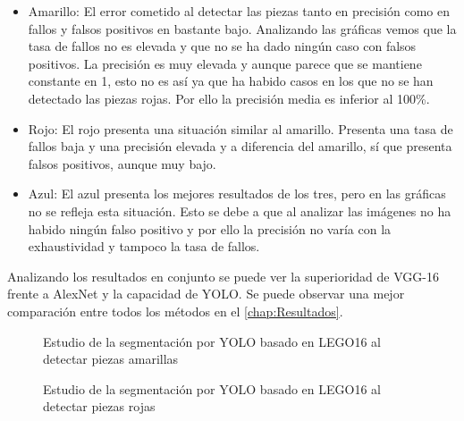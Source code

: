 \begin{itemize}
\item Amarillo: El error cometido al detectar las piezas tanto en precisión como en fallos y falsos positivos en bastante bajo. Analizando las gráficas vemos que la tasa de fallos no es elevada y que no se ha dado ningún caso con falsos positivos. La precisión es muy elevada y aunque parece que se mantiene constante en 1, esto no es así ya que ha habido casos en los que no se han detectado las piezas rojas. Por ello la precisión media es inferior al 100\%.
\item Rojo: El rojo presenta una situación similar al amarillo. Presenta una tasa de fallos baja y una precisión elevada y a diferencia del amarillo, sí que presenta falsos positivos, aunque muy bajo.
\item Azul: El azul presenta los mejores resultados de los tres, pero en las gráficas no se refleja esta situación. Esto se debe a que al analizar las imágenes no ha habido ningún falso positivo y por ello la precisión no varía con la exhaustividad y tampoco la tasa de fallos.
\end{itemize}

Analizando los resultados en conjunto se puede ver la superioridad de VGG-16 frente a AlexNet y la capacidad de YOLO. Se puede observar una mejor comparación entre todos los métodos en el \autoref{chap:Resultados}.

\begin{figure}[ht]  %
\vspace{-30pt}
  \hfill	
\caption{Estudio de la segmentación por YOLO basado en LEGO16 al detectar piezas amarillas}
\label{fig:yellow YOLO LEGO16}
\vspace{-5pt}
\end{figure}

\begin{figure}[ht]  %
\vspace{-30pt}
  \hfill	
\caption{Estudio de la segmentación por YOLO basado en LEGO16 al detectar piezas rojas}
\label{fig:red YOLO LEGO16}
\vspace{-5pt}
\end{figure}


